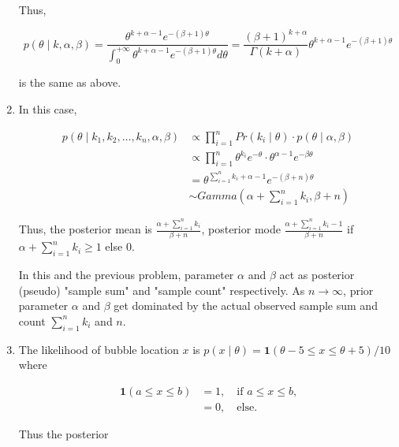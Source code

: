 \documentclass[11pt]{article}
\begin{document}
\begin{enumerate}
    Thus, 

    $$
    p(\theta \mid k, \alpha, \beta) = \frac{\theta^{k+\alpha-1}e^{-(\beta+1)\theta}}{\int_{0}^{+\infty} \theta^{k+\alpha-1}e^{-(\beta+1)\theta} d \theta} = \frac{(\beta+1)^{k+\alpha}}{\Gamma(k+\alpha)} \theta^{k+\alpha-1}e^{-(\beta+1)\theta}
    $$

    is the same as above.

    \item In this case,
    
    $$
    \begin{aligned}
        p(\theta \mid k_{1}, k_{2}, \dots, k_{n}, \alpha, \beta) 
        &\propto \prod_{i=1}^{n} Pr(k_i \mid \theta) \cdot p(\theta \mid \alpha, \beta) \\
        &\propto \prod_{i=1}^{n} \theta^{k_{i}}e^{-\theta} \cdot \theta^{\alpha-1}e^{-\beta \theta} \\
        &= \theta^{\sum_{i=1}^{n} k_i + \alpha - 1} e^{-(\beta + n)\theta} \\
        &\sim Gamma(\alpha + \sum_{i=1}^{n} k_i, \beta + n)
    \end{aligned}
    $$

    Thus, the posterior mean is $\frac{\alpha + \sum_{i=1}^{n} k_i}{\beta + n}$, posterior mode $\frac{\alpha + \sum_{i=1}^{n} k_i - 1}{\beta + n}$ if $\alpha + \sum_{i=1}^{n} k_i \geq 1$ else $0$.

    In this and the previous problem, parameter $\alpha$ and $\beta$ act as posterior (pseudo) "sample sum" and "sample count" respectively. As $n \rightarrow \infty$, prior parameter $\alpha$ and $\beta$ get dominated by the actual observed sample sum and count $\sum_{i=1}^{n} k_i$ and $n$.

    \item The likelihood of bubble location $x$ is $p(x \mid \theta) = \mathbf{1}(\theta - 5 \leq x \leq \theta + 5) / 10$ where 
    
    $$
    \begin{aligned}
        \mathbf{1}(a \leq x \leq b)
        &= 1, \quad \text{if $a \leq x \leq b$,} \\
        &= 0, \quad \text{else.}
    \end{aligned}
    $$

    Thus the posterior


\end{enumerate}
\end{document}
